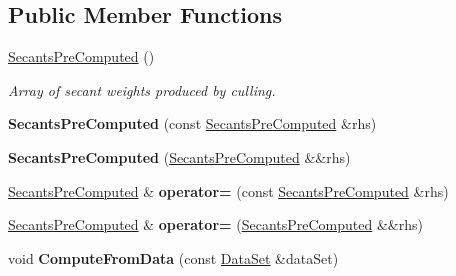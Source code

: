 \subsection*{Public Member Functions}
\begin{DoxyCompactItemize}
\item 
\hypertarget{struct_d_r_d_s_p_1_1_secants_pre_computed_a274ff4f6d95299e768a160e15e6a1a5c}{\hyperlink{struct_d_r_d_s_p_1_1_secants_pre_computed_a274ff4f6d95299e768a160e15e6a1a5c}{Secants\-Pre\-Computed} ()}\label{struct_d_r_d_s_p_1_1_secants_pre_computed_a274ff4f6d95299e768a160e15e6a1a5c}

\begin{DoxyCompactList}\small\item\em Array of secant weights produced by culling. \end{DoxyCompactList}\item 
\hypertarget{struct_d_r_d_s_p_1_1_secants_pre_computed_a11e28de45102b068cf71cb2c9d6fca68}{{\bfseries Secants\-Pre\-Computed} (const \hyperlink{struct_d_r_d_s_p_1_1_secants_pre_computed}{Secants\-Pre\-Computed} \&rhs)}\label{struct_d_r_d_s_p_1_1_secants_pre_computed_a11e28de45102b068cf71cb2c9d6fca68}

\item 
\hypertarget{struct_d_r_d_s_p_1_1_secants_pre_computed_a9a23b0c9136fe8990a00be33787cb0f5}{{\bfseries Secants\-Pre\-Computed} (\hyperlink{struct_d_r_d_s_p_1_1_secants_pre_computed}{Secants\-Pre\-Computed} \&\&rhs)}\label{struct_d_r_d_s_p_1_1_secants_pre_computed_a9a23b0c9136fe8990a00be33787cb0f5}

\item 
\hypertarget{struct_d_r_d_s_p_1_1_secants_pre_computed_a7ca923d368f7131f8628eaf2bcf0d715}{\hyperlink{struct_d_r_d_s_p_1_1_secants_pre_computed}{Secants\-Pre\-Computed} \& {\bfseries operator=} (const \hyperlink{struct_d_r_d_s_p_1_1_secants_pre_computed}{Secants\-Pre\-Computed} \&rhs)}\label{struct_d_r_d_s_p_1_1_secants_pre_computed_a7ca923d368f7131f8628eaf2bcf0d715}

\item 
\hypertarget{struct_d_r_d_s_p_1_1_secants_pre_computed_afd36138af8143a3daa493d988938e784}{\hyperlink{struct_d_r_d_s_p_1_1_secants_pre_computed}{Secants\-Pre\-Computed} \& {\bfseries operator=} (\hyperlink{struct_d_r_d_s_p_1_1_secants_pre_computed}{Secants\-Pre\-Computed} \&\&rhs)}\label{struct_d_r_d_s_p_1_1_secants_pre_computed_afd36138af8143a3daa493d988938e784}

\item 
\hypertarget{struct_d_r_d_s_p_1_1_secants_pre_computed_a07644fb406546e3e6f5adbebd472a968}{void {\bfseries Compute\-From\-Data} (const \hyperlink{struct_d_r_d_s_p_1_1_data_set}{Data\-Set} \&data\-Set)}\label{struct_d_r_d_s_p_1_1_secants_pre_computed_a07644fb406546e3e6f5adbebd472a968}


\end{DoxyCompactItemize}
